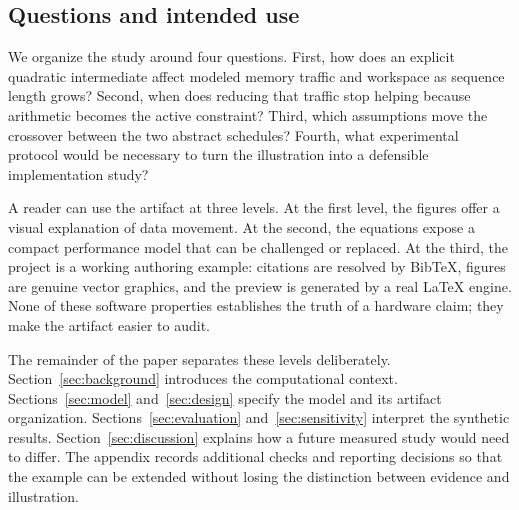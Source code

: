 \subsection{Questions and intended use}
We organize the study around four questions. First, how does an explicit quadratic intermediate affect modeled memory traffic and workspace as sequence length grows? Second, when does reducing that traffic stop helping because arithmetic becomes the active constraint? Third, which assumptions move the crossover between the two abstract schedules? Fourth, what experimental protocol would be necessary to turn the illustration into a defensible implementation study?

A reader can use the artifact at three levels. At the first level, the figures offer a visual explanation of data movement. At the second, the equations expose a compact performance model that can be challenged or replaced. At the third, the project is a working authoring example: citations are resolved by BibTeX, figures are genuine vector graphics, and the preview is generated by a real LaTeX engine. None of these software properties establishes the truth of a hardware claim; they make the artifact easier to audit.

The remainder of the paper separates these levels deliberately. Section~\ref{sec:background} introduces the computational context. Sections~\ref{sec:model} and~\ref{sec:design} specify the model and its artifact organization. Sections~\ref{sec:evaluation} and~\ref{sec:sensitivity} interpret the synthetic results. Section~\ref{sec:discussion} explains how a future measured study would need to differ. The appendix records additional checks and reporting decisions so that the example can be extended without losing the distinction between evidence and illustration.
